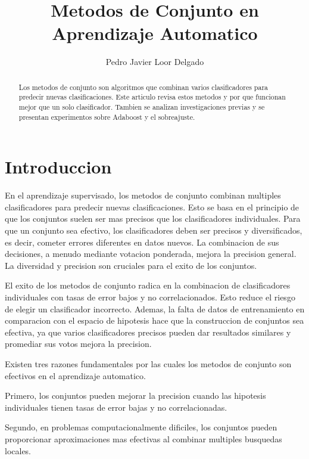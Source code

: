 \documentclass{esannV2}
\begin{document}
\title{Metodos de Conjunto en Aprendizaje Automatico}


\author{Pedro Javier Loor Delgado}

\maketitle

\begin{abstract}
Los metodos de conjunto son algoritmos que combinan varios clasificadores para predecir nuevas clasificaciones. Este articulo revisa estos metodos y por que funcionan mejor que un solo clasificador. Tambien se analizan investigaciones previas y se presentan experimentos sobre Adaboost y el sobreajuste.
\end{abstract}

\section{Introduccion }

En el aprendizaje supervisado, los metodos de conjunto combinan multiples clasificadores para predecir nuevas clasificaciones. Esto se basa en el principio de que los conjuntos suelen ser mas precisos que los clasificadores individuales. Para que un conjunto sea efectivo, los clasificadores deben ser precisos y diversificados, es decir, cometer errores diferentes en datos nuevos. La combinacion de sus decisiones, a menudo mediante votacion ponderada, mejora la precision general. La diversidad y precision son cruciales para el exito de los conjuntos.

El exito de los metodos de conjunto radica en la combinacion de clasificadores individuales con tasas de error bajos y no correlacionados. Esto reduce el riesgo de elegir un clasificador incorrecto. Ademas, la falta de datos de entrenamiento en comparacion con el espacio de hipotesis hace que la construccion de conjuntos sea efectiva, ya que varios clasificadores precisos pueden dar resultados similares y promediar sus votos mejora la precision.

Existen tres razones fundamentales por las cuales los metodos de conjunto son efectivos en el aprendizaje automatico.

Primero, los conjuntos pueden mejorar la precision cuando las hipotesis individuales tienen tasas de error bajas y no correlacionadas.

Segundo, en problemas computacionalmente dificiles, los conjuntos pueden proporcionar aproximaciones mas efectivas al combinar multiples busquedas locales.
\end{document}
